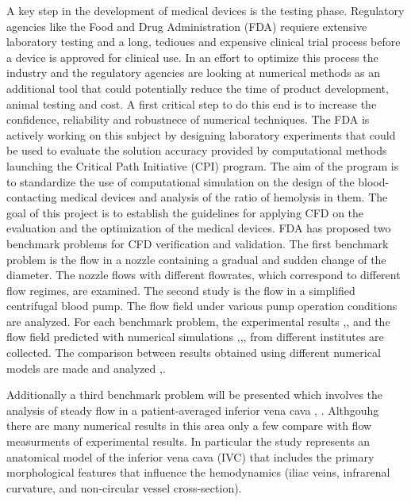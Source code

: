 A key step in the development of medical devices is the testing phase. Regulatory agencies like the Food and Drug Administration (FDA) requiere extensive laboratory testing and a long, tedioues and expensive clinical trial process before a device is approved for clinical use. In an effort to optimize this process the industry and the regulatory agencies are looking at numerical methods as an additional tool that could potentially reduce the time of product development, animal testing and cost. A first critical step to do this end is to increase the confidence, reliability and robustnece of numerical techniques. The FDA is actively working on this subject by designing laboratory experiments that could be used to evaluate the solution accuracy provided by computational methods launching the Critical Path Initiative (CPI) \cite{cpi} program. The aim of the program is to standardize the use of computational simulation on the design of the blood-contacting medical
devices and analysis of the ratio of hemolysis in them. The goal of this project is to establish the guidelines for
applying CFD on the evaluation and the optimization of the medical devices. FDA has proposed two benchmark
problems \cite{cpi1} for CFD verification and validation. The first benchmark problem is the flow in a nozzle
containing a gradual and sudden change of the diameter. The nozzle flows with different flowrates, which
correspond to different flow regimes, are examined. The second study is the flow in a simplified centrifugal
blood pump. The flow field under various pump operation conditions are analyzed. For each benchmark
problem, the experimental results \cite{fda_res},\cite{fda_nozzle}, \cite{fda_pump} and the flow field predicted with numerical simulations \cite{fda_numrob},\cite{hariharan_nozzle},\cite{nassau_pump},\cite{heck_hemo} from
different institutes are collected. The comparison between results obtained using different numerical models are
made and analyzed \cite{stewart_cfd},\cite{mali_cfd}. 

Additionally a third benchmark problem will be presented which involves the analysis of steady flow in a patient-averaged inferior vena cava \cite{gallagher_exp}, \cite{craven_cfd}. Althgouhg there are many numerical results in this area only a few compare with flow measurments of experimental results. In particular the study represents an anatomical model of the  inferior vena cava (IVC) that includes the primary morphological features that influence the hemodynamics (iliac veins, infrarenal curvature, and non-circular vessel cross-section).


